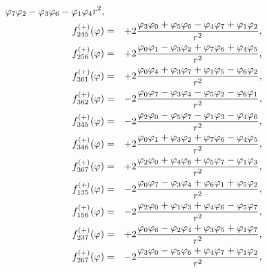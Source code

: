 \documentclass[a4paper,12pt]{book}
\begin{document}
\begin{eqnarray}
{{{\varphi _{7}}{\varphi _{2}}-{\varphi _{3}}{\varphi _{6}}-{\varphi _{1}}{%
\varphi _{4}}}{r^{2}},}  \nonumber \\
{{f}_{245}^{(+)}{(\varphi )}} &=&+2{\frac{{\varphi _{3}}{\varphi _{0}}+{%
\varphi _{5}}{\varphi _{6}}-{\varphi _{4}}{\varphi _{7}}+{\varphi _{1}}{%
\varphi _{2}}}{r^{2}},}  \nonumber \\
{\quad {f}_{256}^{(+)}{(\varphi )}} &=&+2{\frac{{\varphi _{0}}{\varphi _{1}}-%
{\varphi _{3}}{\varphi _{2}}+{\varphi _{7}}{\varphi _{6}}+{\varphi _{4}}{%
\varphi _{5}}}{r^{2}},}  \nonumber \\
{{f}_{361}^{(+)}{(\varphi )}} &=&+2{\frac{{\varphi _{0}}{\varphi _{4}}+{%
\varphi _{3}}{\varphi _{7}}+{\varphi _{1}}{\varphi _{5}}-{\varphi _{6}}{%
\varphi _{2}}}{r^{2}},}  \nonumber \\
{\quad {f}_{362}^{(+)}{(\varphi )}} &=&-2{\frac{{\varphi _{0}}{\varphi _{7}}-%
{\varphi _{3}}{\varphi _{4}}-{\varphi _{5}}{\varphi _{2}}-{\varphi _{6}}{%
\varphi _{1}}}{r^{2}},}  \nonumber \\
{{f}_{345}^{(+)}{(\varphi )}} &=&-2{\frac{{\varphi _{2}}{\varphi _{0}}-{%
\varphi _{5}}{\varphi _{7}}-{\varphi _{1}}{\varphi _{3}}-{\varphi _{4}}{%
\varphi _{6}}}{r^{2}},}  \nonumber \\
{\quad {f}_{346}^{(+)}{(\varphi )}} &=&+2{\frac{{\varphi _{0}}{\varphi _{1}}+%
{\varphi _{3}}{\varphi _{2}}+{\varphi _{7}}{\varphi _{6}}-{\varphi _{4}}{%
\varphi _{5}}}{r^{2}},}  \nonumber \\
{{f}_{367}^{(+)}{(\varphi )}} &=&+2{\frac{{\varphi _{2}}{\varphi _{0}}+{%
\varphi _{4}}{\varphi _{6}}+{\varphi _{5}}{\varphi _{7}}-{\varphi _{1}}{%
\varphi _{3}}}{{r^{2}}},}  \nonumber \\
{\quad {f}_{135}^{(+)}{(\varphi )}} &=&-2{\frac{{\varphi _{0}}{\varphi _{7}}-%
{\varphi _{3}}{\varphi _{4}}+{\varphi _{6}}{\varphi _{1}}+{\varphi _{5}}{%
\varphi _{2}}}{r^{2}},}  \nonumber \\
{{f}_{156}^{(+)}{(\varphi )}} &=&-2{\frac{{\varphi _{2}}{\varphi _{0}}+{%
\varphi _{1}}{\varphi _{3}}+{\varphi _{4}}{\varphi _{6}}-{\varphi _{5}}{%
\varphi _{7}}}{r^{2}},}  \nonumber \\
{\quad {f}_{237}^{(+)}{(\varphi )}} &=&+2{\frac{{\varphi _{0}}{\varphi _{6}}-%
{\varphi _{2}}{\varphi _{4}}+{\varphi _{3}}{\varphi _{5}}+{\varphi _{1}}{%
\varphi _{7}}}{r^{2}},}  \nonumber \\
{{f}_{267}^{(+)}{(\varphi )}} &=&-2{\frac{{\varphi _{3}}{\varphi _{0}}-{%
\varphi _{5}}{\varphi _{6}}+{\varphi _{4}}{\varphi _{7}}+{\varphi _{1}}{%
\varphi _{2}}}{r^{2}},}  \nonumber \\

\end{eqnarray}
\end{document}
